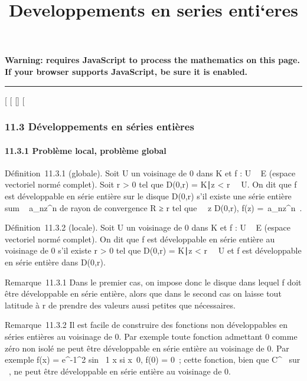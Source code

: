 \documentclass[]{article}
\title{Developpements en series enti`eres}
\author{}
\date{}
\begin{document}
\maketitle

\textbf{Warning: 
requires JavaScript to process the mathematics on this page.\\ If your
browser supports JavaScript, be sure it is enabled.}

\begin{center}\rule{3in}{0.4pt}\end{center}

{[}
{[}
{[}{]}
{[}

\subsubsection{11.3 Développements en séries entières}

\paragraph{11.3.1 Problème local, problème global}

Définition~11.3.1 (globale). Soit U un voisinage de 0 dans K et f : U \rightarrow~
E (espace vectoriel normé complet). Soit r \textgreater{} 0 tel que
D(0,r) = \z \in
K∣z \textless{}
r\ \subset~ U. On dit que f est développable en série entière
sur le disque D(0,r) s'il existe une série entière
\\sum ~
a_nz^n de rayon de convergence R ≥ r tel que
\forall~~z \in D(0,r), f(z) =\
\sum  a_nz^n~.

Définition~11.3.2 (locale). Soit U un voisinage de 0 dans K et f : U \rightarrow~ E
(espace vectoriel normé complet). On dit que f est développable en série
entière au voisinage de 0 s'il existe r \textgreater{} 0 tel que D(0,r)
= \z \in
K∣z \textless{}
r\ \subset~ U et f est développable en série entière dans
D(0,r).

Remarque~11.3.1 Dans le premier cas, on impose donc le disque dans
lequel f doit être développable en série entière, alors que dans le
second cas on laisse tout latitude à r de prendre des valeurs aussi
petites que nécessaires.

Remarque~11.3.2 Il est facile de construire des fonctions non
développables en séries entières au voisinage de 0. Par exemple toute
fonction admettant 0 comme zéro non isolé ne peut être développable en
série entière au voisinage de 0. Par exemple f(x) =
e^-1\diagupx^2  sin~  1
\over x si x\neq~0, f(0) = 0~;
cette fonction, bien que C^\infty~ sur ~, ne peut être développable
en série entière au voisinage de 0.
\end{document}
